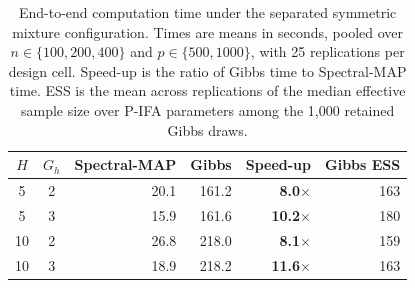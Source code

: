 \begin{table}[t]
\centering
\caption{End-to-end computation time under the separated symmetric mixture configuration. Times are means in seconds, pooled over $n\in\{100,200,400\}$ and $p\in\{500,1000\}$, with 25 replications per design cell. Speed-up is the ratio of Gibbs time to Spectral-MAP time. ESS is the mean across replications of the median effective sample size over P-IFA parameters among the 1,000 retained Gibbs draws.}
\label{tab:runtime_comparison}
\begin{tabular}{ccrrrr}
\toprule
$H$ & $G_h$ & Spectral-MAP & Gibbs & Speed-up & Gibbs ESS \\
\midrule
5 & 2 & 20.1 & 161.2 & \textbf{8.0$\times$} & 163 \\
5 & 3 & 15.9 & 161.6 & \textbf{10.2$\times$} & 180 \\
10 & 2 & 26.8 & 218.0 & \textbf{8.1$\times$} & 159 \\
10 & 3 & 18.9 & 218.2 & \textbf{11.6$\times$} & 163 \\
\bottomrule
\end{tabular}
\end{table}
